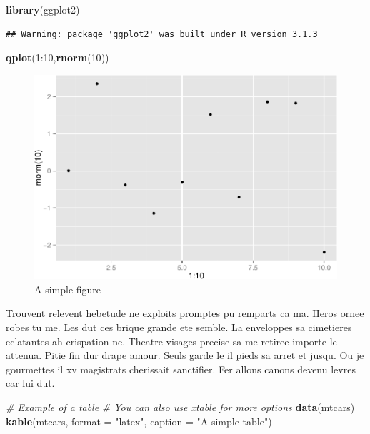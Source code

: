 \documentclass[11pt]{article}
\newenvironment{Shaded}{\begin{snugshade}}{\end{snugshade}}
\newcommand{\KeywordTok}[1]{\textcolor[rgb]{0.13,0.29,0.53}{\textbf{{#1}}}}
\newcommand{\DataTypeTok}[1]{\textcolor[rgb]{0.13,0.29,0.53}{{#1}}}
\newcommand{\DecValTok}[1]{\textcolor[rgb]{0.00,0.00,0.81}{{#1}}}
\newcommand{\StringTok}[1]{\textcolor[rgb]{0.31,0.60,0.02}{{#1}}}
\newcommand{\CommentTok}[1]{\textcolor[rgb]{0.56,0.35,0.01}{\textit{{#1}}}}
\newcommand{\NormalTok}[1]{{#1}}
\begin{document}
\begin{Shaded}
\begin{Highlighting}[]
\KeywordTok{library}\NormalTok{(ggplot2)}
\end{Highlighting}
\end{Shaded}

\begin{verbatim}
## Warning: package 'ggplot2' was built under R version 3.1.3
\end{verbatim}

\begin{Shaded}
\begin{Highlighting}[]
\KeywordTok{qplot}\NormalTok{(}\DecValTok{1}\NormalTok{:}\DecValTok{10}\NormalTok{,}\KeywordTok{rnorm}\NormalTok{(}\DecValTok{10}\NormalTok{))}
\end{Highlighting}
\end{Shaded}

\begin{figure}[htbp]
\centering
\includegraphics{Untitled_files/figure-latex/unnamed-chunk-1-1.pdf}
\caption{A simple figure}
\end{figure}

Trouvent relevent hebetude ne exploits promptes pu remparts ca ma. Heros
ornee robes tu me. Les dut ces brique grande ete semble. La enveloppes
sa cimetieres eclatantes ah crispation ne. Theatre visages precise sa me
retiree importe le attenua. Pitie fin dur drape amour. Seuls garde le il
pieds sa arret et jusqu. Ou je gourmettes il xv magistrats cherissait
sanctifier. Fer allons canons devenu levres car lui dut.

\begin{Shaded}
\begin{Highlighting}[]
\CommentTok{# Example of a table}
\CommentTok{# You can also use xtable for more options}
\KeywordTok{data}\NormalTok{(mtcars)}
\KeywordTok{kable}\NormalTok{(mtcars, }\DataTypeTok{format =} \StringTok{"latex"}\NormalTok{, }\DataTypeTok{caption =} \StringTok{"A simple table"}\NormalTok{)}
\end{Highlighting}
\end{Shaded}
\end{document}
